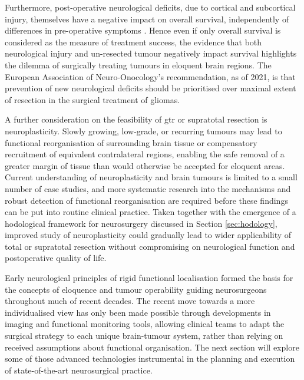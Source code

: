Furthermore, post-operative neurological deficits, due to cortical and subcortical injury, themselves have a negative impact on overall survival, independently of differences in pre-operative symptoms \autocite{Trinh2013,Rahman2016,Rincon-Torroella2019}.
Hence even if only overall survival is considered as the measure of treatment success, the evidence that both neurological injury and un-resected tumour negatively impact survival highlights the dilemma of surgically treating tumours in eloquent brain regions\autocite{Rincon-Torroella2019,Duffau2004,Rahman2016}.
The European Association of Neuro-Onocology's recommendation, as of 2021, is that prevention of new neurological deficits should be prioritised over maximal extent of resection in the surgical treatment of gliomas\autocite{Weller2021}.

A further consideration on the feasibility of \gls{gtr} or supratotal resection is neuroplasticity\autocite{Duffau2005}.
Slowly growing, low-grade, or recurring tumours may lead to functional reorganisation of surrounding brain tissue\autocite{Takahashi2012,Southwell2016,Das2019} or compensatory recruitment of equivalent contralateral regions\autocite{Mitolo2022}, enabling the safe removal of a greater margin of tissue than would otherwise be accepted for eloquent areas\autocite{Rossi2019a}.
Current understanding of neuroplasticity and brain tumours is limited to a small number of case studies, and more systematic research into the mechanisms and robust detection of functional reorganisation are required before these findings can be put into routine clinical practice\autocite{Duffau2005,Abel2015,Satoer2017}.
Taken together with the emergence of a hodological framework for neurosurgery discussed in Section \ref{sec:hodology}\autocite{Sala2019}, improved study of neuroplasticity could gradually lead to wider applicability of total or supratotal resection without compromising on neurological function and postoperative quality of life.

Early neurological principles of rigid functional localisation formed the basis for the concepts of eloquence and tumour operability guiding neurosurgeons throughout much of recent decades.
The recent move towards a more individualised view has only been made possible through developments in imaging and functional monitoring tools, allowing clinical teams to adapt the surgical strategy to each unique brain-tumour system, rather than relying on received assumptions about functional organisation\autocite{Boerger2023}.
The next section will explore some of those advanced technologies instrumental in the planning and execution of state-of-the-art neurosurgical practice.

